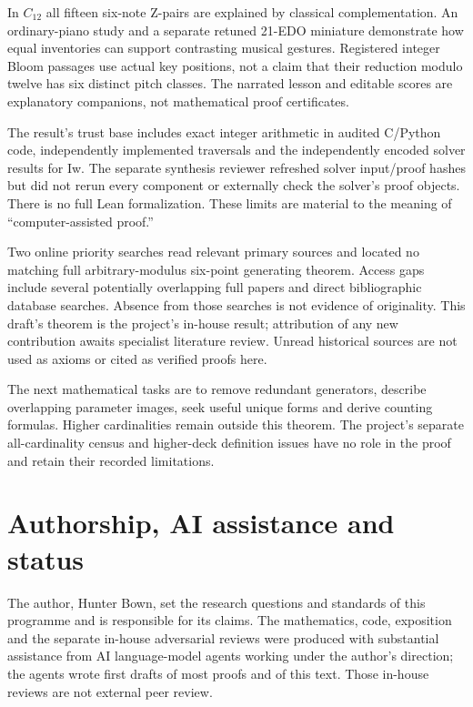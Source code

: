 \documentclass[11pt]{article}
\theoremstyle{remark}
\begin{document}
In $C_{12}$ all fifteen six-note Z-pairs are explained by classical
complementation. An ordinary-piano study and a separate retuned 21-EDO
miniature demonstrate how equal inventories can support contrasting
musical gestures. Registered integer Bloom passages use actual key positions,
not a claim that their reduction modulo twelve has six distinct pitch
classes. The narrated lesson and editable scores are explanatory companions,
not mathematical proof certificates.

The result's trust base includes exact integer arithmetic in audited C/Python
code, independently implemented traversals and the independently encoded
solver results for Iw. The separate synthesis reviewer refreshed solver
input/proof hashes but did not rerun every component or externally check the
solver's proof objects. There is no full Lean formalization. These limits
are material to the meaning of ``computer-assisted proof.''

Two online priority searches read relevant primary sources and located no
matching full arbitrary-modulus six-point generating theorem. Access gaps
include several potentially overlapping full papers and direct bibliographic
database searches. Absence from those searches is not evidence of originality.
This draft's theorem is the project's in-house result; attribution of any
new contribution awaits specialist literature review. Unread historical
sources are not used as axioms or cited as verified proofs here.

The next mathematical tasks are to remove redundant generators, describe
overlapping parameter images, seek useful unique forms and derive counting
formulas. Higher cardinalities remain outside this theorem. The project's
separate all-cardinality census and higher-deck definition issues have no
role in the proof and retain their recorded limitations.

\section*{Authorship, AI assistance and status}
The author, Hunter Bown, set the research questions and standards of this
programme and is responsible for its claims. The mathematics, code,
exposition and the separate in-house adversarial reviews were produced with
substantial assistance from AI language-model agents working under the
author's direction; the agents wrote first drafts of most proofs and of this
text. Those in-house reviews are not external peer review.
\end{document}
